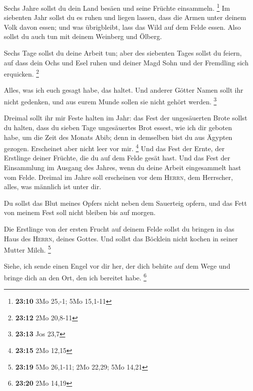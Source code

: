  Sechs Jahre sollst du dein Land besäen und seine Früchte
einsammeln. \footnote{\textbf{23:10} 3Mo 25,-1; 5Mo 15,1-11}
 Im siebenten Jahr sollst du es ruhen und liegen lassen,
dass die Armen unter deinem Volk davon essen; und was übrigbleibt, lass
das Wild auf dem Felde essen. Also sollst du auch tun mit deinem
Weinberg und Ölberg.

 Sechs Tage sollst du deine Arbeit tun; aber des
siebenten Tages sollst du feiern, auf dass dein Ochs und Esel ruhen und
deiner Magd Sohn und der Fremdling sich erquicken. \footnote{\textbf{23:12}
  2Mo 20,8-11}

 Alles, was ich euch gesagt habe, das haltet. Und anderer
Götter Namen sollt ihr nicht gedenken, und aus eurem Munde sollen sie
nicht gehört werden. \footnote{\textbf{23:13} Jos 23,7}

 Dreimal sollt ihr mir Feste halten im Jahr:
 das Fest der ungesäuerten Brote sollst du halten, dass
du sieben Tage ungesäuertes Brot essest, wie ich dir geboten habe, um
die Zeit des Monats Abib; denn in demselben bist du aus Ägypten gezogen.
Erscheinet aber nicht leer vor mir. \footnote{\textbf{23:15} 2Mo 12,15}
 Und das Fest der Ernte, der Erstlinge deiner Früchte,
die du auf dem Felde gesät hast. Und das Fest der Einsammlung im Ausgang
des Jahres, wenn du deine Arbeit eingesammelt hast vom Felde.
 Dreimal im Jahre soll erscheinen vor dem \textsc{Herrn},
dem Herrscher, alles, was männlich ist unter dir.

 Du sollst das Blut meines Opfers nicht neben dem
Sauerteig opfern, und das Fett von meinem Fest soll nicht bleiben bis
auf morgen.

 Die Erstlinge von der ersten Frucht auf deinem Felde
sollst du bringen in das Haus des \textsc{Herrn}, deines Gottes. Und
sollst das Böcklein nicht kochen in seiner Mutter Milch. \footnote{\textbf{23:19}
  5Mo 26,1-11; 2Mo 22,29; 5Mo 14,21}

 Siehe, ich sende einen Engel vor dir her, der dich
behüte auf dem Wege und bringe dich an den Ort, den ich bereitet habe.
\footnote{\textbf{23:20} 2Mo 14,19}

